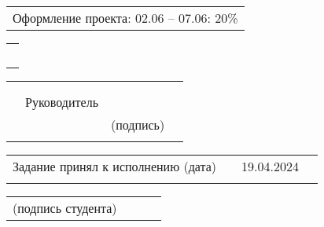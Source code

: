 \documentclass[12pt, А4, twoside]{article}
\begin{document}
\begin{FlushLeft}
    \vspace{-0.1 cm}

    \begin{tabular}{p{17.25cm}}
        \hspace{0.3cm} \textsf{Оформление проекта:} \hspace{0.5cm} \textsf{ 02.06 {--} 07.06:} \hspace{0.5cm} \textsf{20\%} \vspace{0pt} \hline \\
    \end{tabular}

    \begin{tabular}{p{17.25cm}}
        \vspace{0pt} \hline \\
        \vspace{0pt} \hline \\
        \vspace{0pt} \hline \\
        \vspace{0pt} \hline \\
        \vspace{0pt} \hline \\
    \end{tabular}

    \begin{tabular}{p{4.2cm} p{3.8cm} p{6.0cm} p{2.0cm}}
        & & &
        \\
        & & &
        \\
        & \fontsize{14}{17.5} \textsf{Руководитель} &
        \vspace{0pt} \hline &
        \\
        & & \centering \fontsize{12}{15} \textsf{(подпись)} &
        \\
        & & &
    \end{tabular}

\fontsize{12}{15}

    \begin{tabular}{p{7.5cm} p{0.5cm} p{6.0cm} p{2.0cm}}
        \textsf{Задание принял к исполнению (дата)} & &
        \centering \textsf{19.04.2024} \vspace{1pt} \hline &
        \\
        & & &
    \end{tabular}

    \begin{tabular}{p{4.0cm} p{0.2cm} p{9.8cm} p{2.0cm}}
        \textsf{(подпись студента)} & &
        \vspace{0pt} \hline &
        \\ 
    \end{tabular}

\end{FlushLeft}
\end{document}
